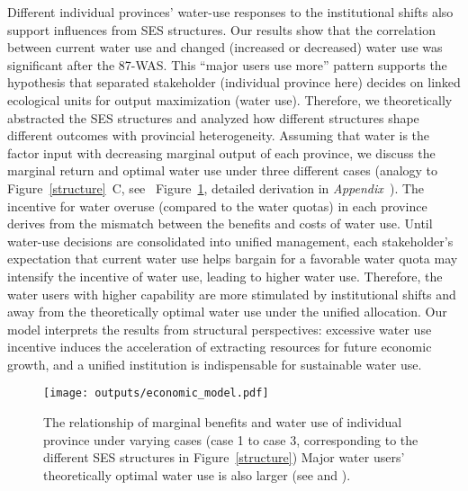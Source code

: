 \label{discussion-2}
Different individual provinces' water-use responses to the institutional shifts also support influences from SES structures.
Our results show that the correlation between current water use and changed (increased or decreased) water use was significant after the 87-WAS.
This ``major users use more'' pattern supports the hypothesis that separated stakeholder (individual province here) decides on linked ecological units for output maximization (water use).
Therefore, we theoretically abstracted the SES structures and analyzed how different structures shape different outcomes with provincial heterogeneity.
Assuming that water is the factor input with decreasing marginal output of each province, we discuss the marginal return and optimal water use under three different cases (analogy to Figure~\ref{structure}~C, see ~Figure~\ref{fig:model}, detailed derivation in \textit{Appendix~}).
The incentive for water overuse (compared to the water quotas) in each province derives from the mismatch between the benefits and costs of water use.
Until water-use decisions are consolidated into unified management, each stakeholder’s expectation that current water use helps bargain for a favorable water quota may intensify the incentive of water use, leading to higher water use.
Therefore, the water users with higher capability are more stimulated by institutional shifts and away from the theoretically optimal water use under the unified allocation.
Our model interprets the results from structural perspectives: excessive water use incentive induces the acceleration of extracting resources for future economic growth, and a unified institution is indispensable for sustainable water use.

\begin{figure}[!ht]
    \centering
    \texttt{[image: outputs/economic\_model.pdf]}
	\caption{
		The relationship of marginal benefits and water use of individual province under varying cases (case 1 to case 3, corresponding to the different SES structures in Figure~\ref{structure}) Major water users' theoretically optimal water use is also larger (see  and \textit{}).}
	\label{fig:model}
\end{figure}

